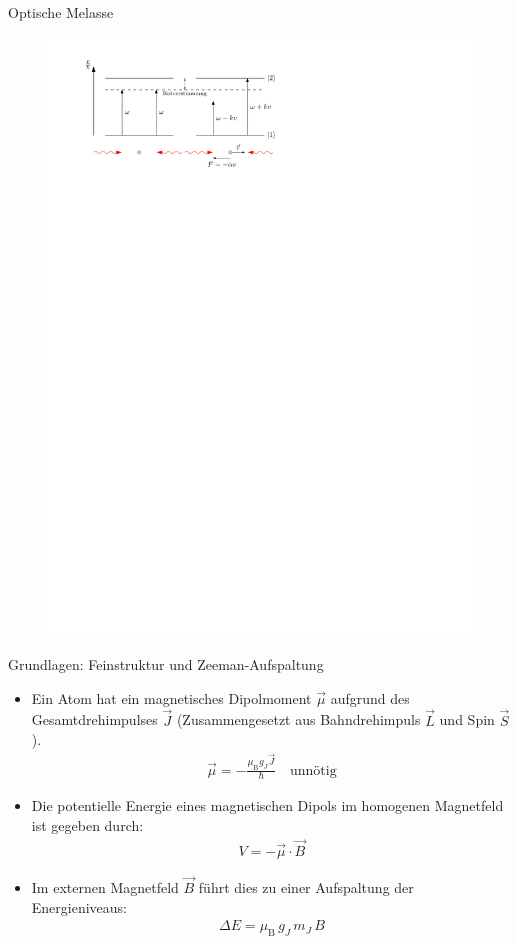 \documentclass[12pt]{beamer}
\begin{document}
\begin{frame}{Optische Melasse}
\begin{figure}[h]
	\centering
	\includegraphics[width=\textwidth]{./figures/melasse.pdf}
\end{figure}
\end{frame}

\begin{frame}{Grundlagen: Feinstruktur und Zeeman-Aufspaltung}
	\begin{itemize}
		\item Ein Atom hat ein magnetisches Dipolmoment $\vec{\mu}$ aufgrund des Gesamtdrehimpulses $\vec{J}$ (Zusammengesetzt aus Bahndrehimpuls $\vec{L}$ und Spin $\vec{S}$).
		\begin{align}
		\vec{\mu} = - \frac{\mu_\mathrm{B} g_J \vec{J}}{\hbar} \quad \text{unnötig}
		\end{align}
		\item Die potentielle Energie eines magnetischen Dipols im homogenen Magnetfeld ist gegeben durch:
		\begin{align}
		V = - \vec{\mu} \cdot \vec{B}
		\end{align}
		\item Im externen Magnetfeld $\vec{B}$ führt dies zu einer Aufspaltung der Energieniveaus:
		\begin{align}
		\Delta E = \mu_\mathrm{B} \, g_J \, m_J \, B
		\end{align}
	\end{itemize}
\end{frame}
\end{document}
